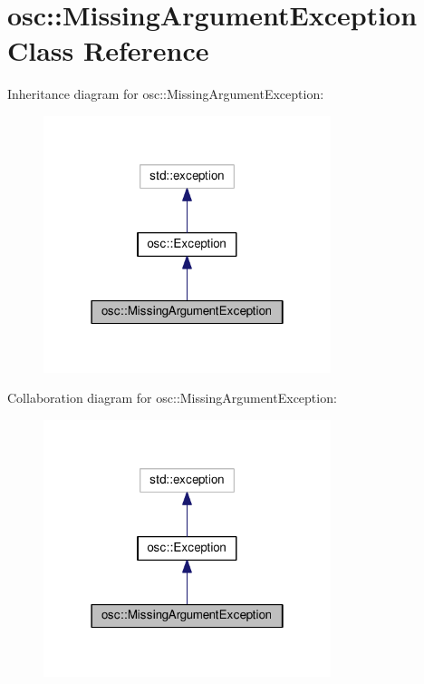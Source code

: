\hypertarget{classosc_1_1_missing_argument_exception}{}\section{osc\+:\+:Missing\+Argument\+Exception Class Reference}
\label{classosc_1_1_missing_argument_exception}


Inheritance diagram for osc\+:\+:Missing\+Argument\+Exception\+:\nopagebreak
\begin{figure}[H]
\begin{center}
\leavevmode
\includegraphics[width=238pt]{classosc_1_1_missing_argument_exception__inherit__graph}
\end{center}
\end{figure}


Collaboration diagram for osc\+:\+:Missing\+Argument\+Exception\+:\nopagebreak
\begin{figure}[H]
\begin{center}
\leavevmode
\includegraphics[width=238pt]{classosc_1_1_missing_argument_exception__coll__graph}
\end{center}
\end{figure}
